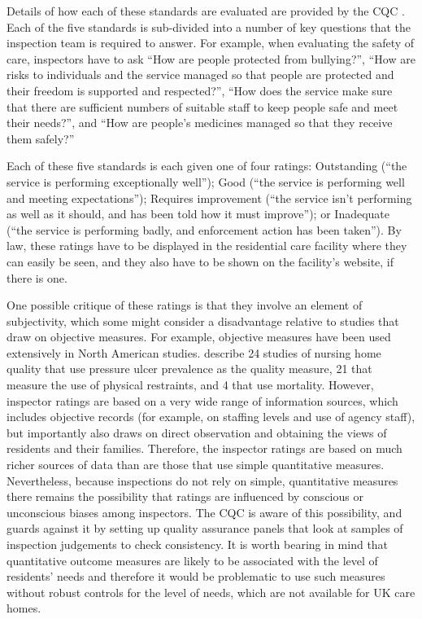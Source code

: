 \documentclass[a4paper,11pt,titlepage,british]{article}
\begin{document}
Details of how each of these standards are evaluated are provided by the CQC \parencite{CQC2016}.  Each of the five standards is sub-divided into a number of key questions that the inspection team is required to answer.  For example, when evaluating the safety of care, inspectors have to ask ``How are people protected from bullying?'', ``How are risks to individuals and the service managed so that people are protected and their freedom is supported and respected?'',  ``How does the service make sure that there are sufficient numbers of suitable staff to keep people safe and meet their needs?'', and ``How are people’s medicines managed so that they receive them safely?''

Each of these five standards is each given one of four ratings: Outstanding (``the service is performing exceptionally well''); Good (“the service is performing well and meeting expectations”); Requires improvement (``the service isn’t performing as well as it should, and has been told how it must improve''); or Inadequate (``the service is performing badly, and enforcement action has been taken''). By law, these ratings have to be displayed in the residential care facility where they can easily be seen, and they also have to be shown on the facility’s website, if there is one.

One possible critique of these ratings is that they involve an element of subjectivity, which some might consider a disadvantage relative to studies that draw on objective measures.  For example, objective measures have been used extensively in North American studies.  \textcite{Comondore2009} describe 24 studies of nursing home quality that use pressure ulcer prevalence as the quality measure, 21 that measure the use of physical restraints, and 4 that use mortality.  However, inspector ratings are based on a very wide range of information sources, which includes objective records (for example, on staffing levels and use of agency staff), but importantly also draws on direct observation and obtaining the views of residents and their families.  Therefore, the inspector ratings are based on much richer sources of data than are those that use simple quantitative measures.  Nevertheless, because inspections do not rely on simple, quantitative measures there remains the possibility that ratings are influenced by conscious or unconscious biases among inspectors.  The CQC is aware of this possibility, and guards against it by setting up quality assurance panels that look at samples of inspection judgements to check consistency.  It is worth bearing in mind that quantitative outcome measures are likely to be associated with the level of residents’ needs and therefore it would be problematic to use such measures without robust controls for the level of needs, which are not available for UK care homes.
\end{document}
